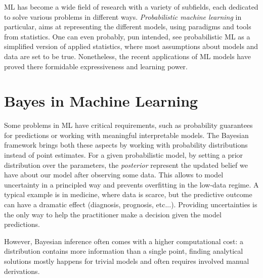 

\ifpdf
    \graphicspath{{chapters/1_introduction/figures/}}
\else
    \graphicspath{{1_introduction/figures/EPS/}{1_introduction/figures/}}
\fi


\ac{ML} has become a wide field of research with a variety of subfields, each dedicated to solve various problems in different ways.
\textit{Probabilistic machine learning} in particular, aims at representing the different models, using paradigms and tools from statistics.
One can even probably, pun intended, see probabilistic \ac{ML} as a simplified version of applied statistics, where most assumptions about models and data are set to be true. 
Nonetheless, the recent applications of \ac{ML} models have proved there formidable expressiveness and learning power.
 

\section{Bayes in Machine Learning}

Some problems in \ac{ML} have critical requirements, such as probability guarantees for predictions or working with meaningful interpretable models.
The Bayesian framework brings both these aspects by working with probability distributions instead of point estimates.
For a given probabilistic model, by setting a prior distribution over the parameters, the \textit{posterior} represent the updated belief we have about our model after observing some data.
This allows to model uncertainty in a principled way and prevents overfitting in the low-data regime.
A typical example is in medicine, where data is scarce, but the predictive outcome can have a dramatic effect (diagnosis, prognosis, etc...).
Providing uncertainties is the only way to help the practitioner make a decision given the model predictions.

However, Bayesian inference often comes with a higher computational cost: a distribution contains more information than a single point, finding analytical solutions mostly happens for trivial models and often requires involved manual derivations.

